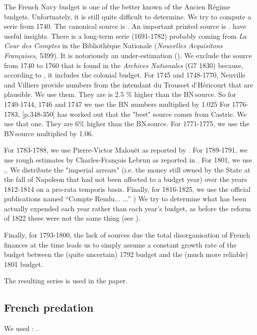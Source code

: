\documentclass[12pt,a4paper,notitlepage,english]{article}
\begin{document}
\begin{appendix}
The French Navy budget is one of the better known of the Ancien Régime budgets. Unfortnately, it is still quite difficult to determine. We try to compute a serie from 1740.
The canonical source is \cite{Legoherel1965}.
An important printed source is \cite{Neuville1898}. \cite{Dull1975, Villiers2002} have useful insights.
There is a long-term serie (1691-1782) probably coming from \textit{La Cour des Comptes} in the Bibliothèque Nationale (\textit{Nouvelles Acquisitons Françaises}, 5399).
It is notoriously an under-estimation (\cite{Villiers2002}).
We exclude the source from 1740 to 1760 that is found in the \textit{Archives Nationales} (G7 1830) because, according to \cite{Villiers2002}, it includes the colonial budget.
For 1745 and 1748-1770, Neuville and Villiers provide numbers from the intendant du Trousset d’Héricourt that are plausible.
We use them.
They are is 2.5 \% higher than the BN source.
So for 1740-1744, 1746 and 1747 we use the BN numbers multiplied by 1.025
For 1776-1783, \cite{Dull1975}[p.348-350] has worked out that the "best" source comes from Castrie.
We use that one.
They are 6\% higher than the BN source.
For 1771-1775, we use the BN source multiplied by 1.06.

For 1783-1788, we use Pierre-Victor Malouët as reported by \cite{Villiers2002}. For 1789-1791, we use rough estimates by Charles-François Lebrun as reported in \cite[][ p. 259 and 332]{Marion1914}. For 1801, we use \cite{Branda2007},. We distribute the "imperial arrears" (i.e. the money still owned by the State at the fall of Napoleon that had not been affected to a budget year) over the years 1812-1814 on a pro-rata temporis basis.
Finally, for 1816-1825, we use the official publications named ``Compte Rendu... ...'' \citep{1814,1818,1826})
We try to determine what has been actually expended each year rather than each year’s budget, as before the reform of 1822 these were not the same thing (see \cite{Kott2019}).

Finally, for 1793-1800, the lack of sources due the total disorganisation of French finances at the time leads us to simply assume a constant growth rate of the budget between the (quite uncertain) 1792 budget and the (much more reliable) 1801 budget.

The resulting series is used in the paper.

\subsection{French predation} \label{french_predation}
We used : \cite{Villiers2002,Villiers2007,Marzagalli2013,Aumont2016,Aumont2016a,Crowhurst1989}.


\end{appendix}
\end{document}
